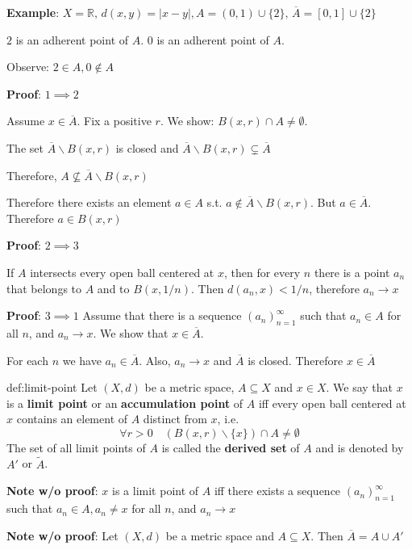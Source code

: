 \documentclass[landscape, 8pt]{extarticle}
\begin{document}
\begin{multicols}{3}
\textbf{Example}: $X = \mathbb{R},\,d(x,y) = \lvert x - y \rvert, A = (0,1)\cup \{2\},\, \overline{A} = [0,1] \cup \{2\}$

$2$ is an adherent point of $A$. $0$ is an adherent point of $A$.

Observe: $2\in A, 0\not\in A$

\textbf{Proof}: $1 \implies 2$

Assume $x\in \overline{A}$. Fix a positive $r$. We show: $B(x,r)\cap A\ne \emptyset$.

The set $\overline{A} \backslash B(x,r)$ is closed and $\overline{A} \backslash B(x,r) \subsetneq \overline{A}$

Therefore, $A \not \subseteq \overline{A} \backslash B(x,r)$

Therefore there exists an element $a\in A$ s.t. $a\not\in \overline{A} \backslash B(x,r)$. But $a\in \overline{A}$. Therefore $a\in B(x,r)$

\textbf{Proof}: $2 \implies 3$

If $A$ intersects every open ball centered at $x$, then for every $n$ there is a point $a_{n}$ that belongs to $A$ and to $B(x, 1 /n)$. Then $d(a_{n}, x) < 1 /n$, therefore $a_{n}\to x$

\textbf{Proof}: $3\implies 1$
Assume that there is a sequence $(a_{n})^{\infty}_{n=1}$ such that $a_{n}\in A$ for all $n$, and $a_{n}\to x$. We show that $x\in \overline{A}$.

For each $n$ we have $a_{n}\in \overline{A}$. Also, $a_{n}\to x$ and $\overline{A}$ is closed. Therefore $x\in \overline{A}$

\begin{dfn}{def:limit-point}{}
    Let $(X, d)$ be a metric space, $A \subseteq X$ and $x\in X$. We say that $x$ is a \textbf{limit point} or an \textbf{accumulation point} of $A$ iff every open ball centered at $x$ contains an element of $A$ distinct from $x$, i.e.
    \[\forall r > 0 \quad (B(x,r) \backslash \{x\}) \cap A \ne \emptyset\]
    The set of all limit points of $A$ is called the \textbf{derived set} of $A$ and is denoted by $A'$ or $\tilde{A}$.
\end{dfn}

\textbf{Note w/o proof}: $x$ is a limit point of $A$ iff there exists a sequence $(a_{n})^{\infty}_{n=1}$ such that $a_{n}\in A, a_{n} \ne x$ for all $n$, and $a_{n}\to x$

\textbf{Note w/o proof}: Let $(X, d)$ be a metric space and $A \subseteq X$. Then $\overline{A} = A \cup A'$


\end{multicols}
\end{document}
